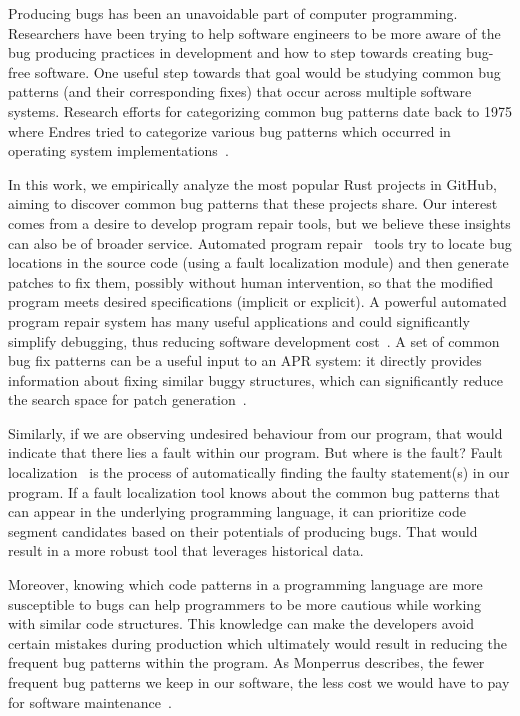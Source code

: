 Producing bugs has been an unavoidable part of computer programming. Researchers have been trying to help software engineers to be more aware of the bug producing practices in development and how to step towards creating bug-free software. One useful step towards that goal would be studying common bug patterns (and their corresponding fixes) that occur across multiple software systems. Research efforts for categorizing common bug patterns date back to 1975 where Endres tried to categorize various bug patterns which occurred in operating system implementations~\cite{endres1975analysis}.  

In this work, we empirically analyze the most popular Rust projects in GitHub, aiming to discover common bug patterns that these projects share. Our interest comes from a desire to develop program repair tools, but we believe these insights can also be of broader service. Automated program repair~\cite{goues2019automated,liu2018survey} tools try to locate bug locations in the source code (using a fault localization module) and then generate patches to fix them, possibly without human intervention, so that the modified program meets desired specifications (implicit or explicit). A powerful automated program repair system has many useful applications and could significantly simplify debugging, thus reducing software development cost~\cite{le2012systematic}. A set of common bug fix patterns can be a useful input to an APR system: it directly provides information about fixing similar buggy structures, which can significantly reduce the search space for patch generation~\cite{jeffrey2009bugfix}. 

Similarly, if we are observing undesired behaviour from our program, that would indicate that there lies a fault within our program. But where is the fault? Fault localization~\cite{wong2016survey} is the process of automatically finding the faulty statement(s) in our program. If a fault localization tool knows about the common bug patterns that can appear in the underlying programming language, it can prioritize code segment candidates based on their potentials of producing bugs. That would result in a more robust tool that leverages historical data.

Moreover, knowing which code patterns in a programming language are more susceptible to bugs can help programmers to be more cautious while working with similar code structures. This knowledge can make the developers avoid certain mistakes during production which ultimately would result in reducing the frequent bug patterns within the program. As Monperrus describes, the fewer frequent bug patterns we keep in our software, the less cost we would have to pay for software maintenance~\cite{monperrus2014critical}.


